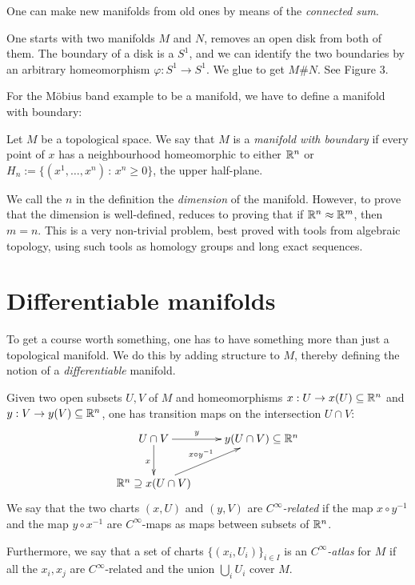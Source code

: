 \documentclass[11pt, english]{article}
\begin{document}
\begin{example}
\label{connectedsum}
One can make new manifolds from old ones by means of the \emph{connected sum}.

One starts with two manifolds $M$ and $N$, removes an open disk from both of them. The boundary of a disk is a $S^1$, and we can identify the two boundaries by an arbitrary homeomorphism $\varphi:S^1 \to S^1$. We glue to get $M\#N$. See Figure 3.%
\end{example}

For the Möbius band example to be a manifold, we have to define a manifold with boundary:
\begin{defi}
Let $M$ be a topological space. We say that $M$ is a \emph{manifold with boundary} if every point of $x$ has a neighbourhood homeomorphic to either $\mathbb{R}^n$ or $H_n:=\{ (x^1,\dotsc,x^n) \, : \, x^n \geq 0 \}$, the upper half-plane.
\end{defi}

We call the $n$ in the definition the \emph{dimension} of the manifold. However, to prove that the dimension is well-defined, reduces to proving that if $\mathbb{R}^n \approx \mathbb{R}^m$, then $m=n$. This is a very non-trivial problem, best proved with tools from algebraic topology, using such tools as homology groups and long exact sequences.

\newpage
\section{Differentiable manifolds}

To get a course worth something, one has to have something more than just a topological manifold. We do this by adding structure to $M$, thereby defining the notion of a \emph{differentiable} manifold.

Given two open subsets $U,V$ of $M$ and homeomorphisms $x:U \to x(U) \subseteq \mathbb{R}^n$ and $y:V \to y(V) \subseteq \mathbb{R}^n$, one has transition maps on the intersection $U \cap V$:
\[
\xymatrix{
 U \cap V \ar[d]_x \ar[r]^-y & y(U \cap V)  \subseteq \R^n \\
\R^n \supseteq  x(U \cap V) \ar[ur]^{x \circ y^{-1}}
}
\]
We say that the two charts $(x,U)$ and $(y,V)$ are \emph{$C^\infty$-related} if the map $x \circ y^{-1}$ and the map $y \circ x^{-1}$ are $C^\infty$-maps as maps between subsets of $\mathbb{R}^n$.

Furthermore, we say that a set of charts $\{ (x_i, U_i)\}_{i \in I}$ is an \emph{$C^\infty$-atlas} for $M$ if all the $x_i,x_j$ are $C^\infty$-related and the union $\bigcup_i U_i$ cover $M$.
\end{document}
